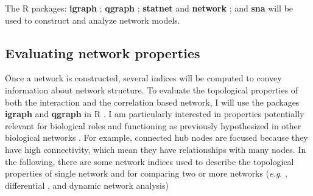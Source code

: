 The \textsf{R} packages: \textbf{igraph} ; \textbf{qgraph} ; \textbf{statnet}  and \textbf{network} ; and \textbf{sna}  will be used to construct and analyze network models.


\subsection*{Evaluating network properties}

Once a network is constructed, several indices will be computed to convey information about network structure. To evaluate the topological properties of both the interaction and the correlation based network, I will use the packages \textbf{igraph} and \textbf{qgraph} in \textsf{R} . I am particularly interested in properties potentially relevant for biological roles and functioning as previously hypothesized in other biological networks . For example, connected hub nodes are focused because they have high connectivity, which mean they have relationships with many nodes. In the following, there are some network indices used to describe the topological properties of single network and for comparing two or more networks (\textit{e.g}. , differential , and dynamic network analysis) 



